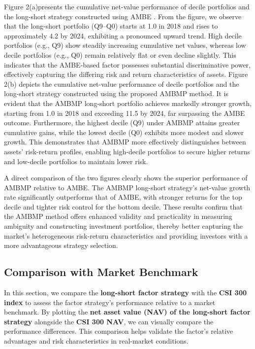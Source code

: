 \documentclass[preprint,12pt,authoryear]{elsarticle}
\begin{document}
Figure 2(a)presents the cumulative net-value performance of decile portfolios and the long-short strategy constructed using AMBE . From the figure, we observe that the long-short portfolio (Q9--Q0)
starts at 1.0 in 2018 and rises to approximately 4.2 by 2024, exhibiting a pronounced upward trend. High decile portfolios (e.g., Q9) show steadily increasing cumulative net values, whereas low decile portfolios (e.g., Q0) remain relatively flat or even decline slightly. This indicates that the AMBE-based factor possesses substantial discriminative power, effectively capturing the differing risk and return characteristics of assets. Figure 2(b) depicts the cumulative net-value performance of decile portfolios and the long-short strategy constructed using the proposed AMBMP method. It
is evident that the AMBMP long-short portfolio achieves markedly stronger growth, starting from 1.0 in 2018 and exceeding 11.5 by 2024, far surpassing the AMBE outcome. Furthermore, the highest decile (Q9) under AMBMP attains greater cumulative gains, while the lowest decile (Q0) exhibits more modest and slower growth. This demonstrates that AMBMP more effectively distinguishes between assets’ risk-return profiles, enabling high-decile portfolios to secure higher returns and low-decile portfolios to maintain lower risk.

A direct comparison of the two figures clearly shows the superior
performance of AMBMP relative to AMBE. The AMBMP long-short strategy’s
net-value growth rate significantly outperforms that of AMBE, with stronger returns for the top decile and tighter risk control for the bottom decile. These results confirm that the AMBMP method offers enhanced validity and practicality in measuring ambiguity and constructing investment portfolios, thereby better capturing the market’s heterogeneous risk-return characteristics and providing investors with a more advantageous strategy selection.



\subsection{Comparison with Market Benchmark}
In this section, we compare the \textbf{long-short factor strategy} with the \textbf{CSI 300 index} to assess the factor strategy's performance relative to a market benchmark. By plotting the \textbf{net asset value (NAV) of the long-short factor strategy} alongside the \textbf{CSI 300 NAV}, we can visually compare the performance differences. This comparison helps validate the factor's relative advantages and risk characteristics in real-market conditions.
\end{document}
